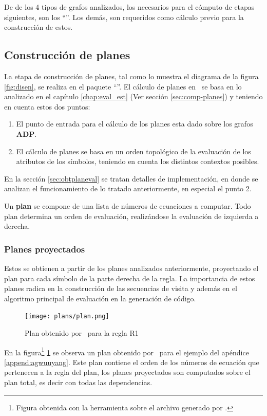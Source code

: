 De de los 4 tipos de grafos analizados, los necesarios para el cómputo de etapas siguientes, son los ``''. Los demás, son requeridos como cálculo previo para la construcción de estos.

\subsection{Construcción de planes}
\label{subsec:conts-plan-dise}
La etapa de construcción de planes, tal como lo muestra el diagrama de la figura \ref{fig:disen}, se realiza en el paquete ``''. El cálculo de planes en \maggen\ se basa en lo analizado en el capítulo \ref{chap:eval_est} (Ver sección \ref{sec:comp-planes}) y teniendo en cuenta estos dos puntos:

\begin{enumerate}
\item El punto de entrada para el cálculo de los planes esta dado sobre los grafos \textbf{ADP}. 
\item El cálculo de planes se basa en un orden topológico de la evaluación de los atributos de los símbolos, teniendo en cuenta los distintos contextos posibles.
\end{enumerate}

En la sección \ref{sec:obtplaneval} se tratan detalles de implementación, en donde se analizan el funcionamiento de lo tratado anteriormente, en especial el punto 2.

Un \textbf{plan} se compone de una lista de números de ecuaciones a computar. Todo plan determina un orden de evaluación, realizándose la evaluación de izquierda a derecha.

\subsubsection{Planes proyectados}

Estos se obtienen a partir de los planes analizados anteriormente, proyectando el plan para cada símbolo de la parte derecha de la regla. La importancia de estos planes radica en la construcción de las secuencias de visita y además en el algoritmo principal de evaluación en la generación de código.

\begin{figure}[!ht]\centering
 \texttt{[image: plans/plan.png]}
\caption{\label{fig:plan}Plan obtenido por \maggen\ para la regla R1}
\end{figure}

En la figura\footnote{Figura obtenida con la herramienta  sobre el archivo  generado por \maggen.} \ref{fig:plan} se observa un plan obtenido por \maggen\ para el ejemplo del apéndice \ref{append:agwuuyang}. Este plan contiene el orden de los números de ecuación que pertenecen a la regla del plan, los planes proyectados son computados sobre el plan total, es decir con todas las dependencias.

